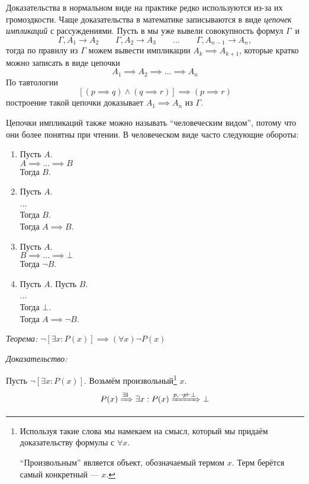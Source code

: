 Доказательства в нормальном виде на практике редко используются из-за их
громоздкости.
Чаще доказательства в математике записываются в виде {\it цепочек импликаций}
 с рассуждениями.
Пусть в мы уже вывели совокупность формул $\Gamma$~и
\[
	\Gamma,A_1\to A_2\qquad \Gamma,A_2\to A_3
	\qquad  ... \qquad \Gamma,A_{n-1}\to A_{n},
\]
тогда по правилу \implic{} из $\Gamma$ можем вывести импликации
${A_{k}\implies A_{k+1}}$, которые кратко можно записать в виде цепочки
\[
	A_1\implies A_2\implies ...\implies A_{n}
\]
По тавтологии
\[
	[(p\implies q)\land (q\implies r)]\implies (p\implies r)
\]
построение такой цепочки доказывает $A_1\implies A_{n}$ из $\Gamma$.

Цепочки импликаций также можно называть ``человеческим видом'', потому что они более
понятны при чтении.
В человеческом виде часто следующие обороты:
\begin{fullwidth}
	\begin{multicols}{4}
		\begin{enumerate}[label=(\roman*)]
			\item{}
			Пусть $A$.\\
			$A\implies...\implies B$\\
			Тогда $B$.
			\item{}
			Пусть $A$.\\
			...\\
			Тогда $B$.\\
			Тогда $A\implies B$.
			\item{}
			Пусть $A$.\\
			$B\implies ...\implies \bot$\\
			Тогда $\lnot B$.
			\item{}
			Пусть $A$. Пусть $B$.\\
			...\\
			Тогда $\bot$.\\
			Тогда $A\implies \lnot B$.
		\end{enumerate}
	\end{multicols}
\end{fullwidth}

{\it Теорема:} $\lnot[\exists x:P(x)]\implies (\forall x)\lnot P(x)$

{\it Доказательство:}

Пусть ${\lnot[\exists x:P(x)]}$.
Возьмём произвольный\footnote{
	Используя такие слова мы намекаем на смысл, который мы придаём доказательству
	формулы с $\forall x$.

	``Произвольным'' является объект, обозначаемый термом $x$.
	Терм берётся самый конкретный --- $x$.} $x$.
\[
	P(x)\xRightarrow{\text{$\exists$I}} \exists x:P(x)
	\xRightarrow{p,\lnot p\vdash\bot} \bot
\]

